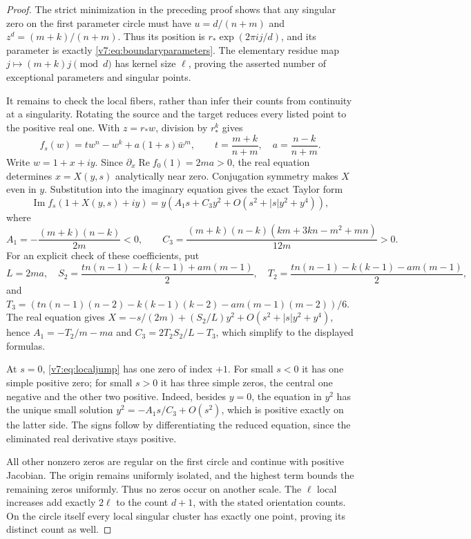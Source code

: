 \documentclass[UTF8,11pt]{ctexart}
\theoremstyle{definition}
\numberwithin{equation}{section}
\DeclareMathOperator{\Rea}{Re}\DeclareMathOperator{\Ima}{Im}
\begin{document}
\begin{proof}
The strict minimization in the preceding proof shows that any
singular zero on the first parameter circle must have
$u=d/(n+m)$ and $z^d=(m+k)/(n+m)$. Thus its position is
$r_*\exp(2\pi ij/d)$, and its parameter is exactly
\eqref{v7:eq:boundaryparameters}. The elementary residue map
$j\mapsto(m+k)j\pmod d$ has kernel size $\ell$, proving the
asserted number of exceptional parameters and singular points.

It remains to check the local fibers, rather than infer their
counts from continuity at a singularity. Rotating the source
and the target reduces every listed point to the positive real
one. With $z=r_*w$, division by $r_*^k$ gives
\[
 f_s(w)=t w^n-w^k+a(1+s)\bar w^m,\qquad
 t=\frac{m+k}{n+m},\quad a=\frac{n-k}{n+m}.
\]
Write $w=1+x+iy$. Since $\partial_x\Rea f_0(1)=2ma>0$,
the real equation determines $x=X(y,s)$ analytically near zero.
Conjugation symmetry makes $X$ even in $y$. Substitution into
the imaginary equation gives the exact Taylor form
\begin{equation}\label{v7:eq:localjump}
 \Ima f_s(1+X(y,s)+iy)
 =y\left(A_1s+C_3y^2+O(s^2+|s|y^2+y^4)\right),
\end{equation}
where
\[
 A_1=-\frac{(m+k)(n-k)}{2m}<0,\qquad
 C_3=\frac{(m+k)(n-k)(km+3kn-m^2+mn)}{12m}>0.
\]
For an explicit check of these coefficients, put
\[
 L=2ma,\quad
 S_2=\frac{tn(n-1)-k(k-1)+am(m-1)}2,\quad
 T_2=\frac{tn(n-1)-k(k-1)-am(m-1)}2,
\]
and $T_3=(tn(n-1)(n-2)-k(k-1)(k-2)-am(m-1)(m-2))/6$.
The real equation gives
$X=-s/(2m)+(S_2/L)y^2+O(s^2+|s|y^2+y^4)$, hence
$A_1=-T_2/m-ma$ and $C_3=2T_2S_2/L-T_3$, which simplify
to the displayed formulas.

At $s=0$, \eqref{v7:eq:localjump} has one zero of index $+1$.
For small $s<0$ it has one simple positive zero; for small
$s>0$ it has three simple zeros, the central one negative
and the other two positive. Indeed, besides $y=0$, the equation
in $y^2$ has the unique small solution
$y^2=-A_1s/C_3+O(s^2)$, which is positive exactly on the latter
side. The signs follow by differentiating the reduced equation,
since the eliminated real derivative stays positive.

All other nonzero zeros are regular on the first circle and
continue with positive Jacobian. The origin remains uniformly
isolated, and the highest term bounds the remaining zeros
uniformly. Thus no zeros occur on another scale. The $\ell$
local increases add exactly $2\ell$ to the count $d+1$, with
the stated orientation counts. On the circle itself every
local singular cluster has exactly one point, proving its
distinct count as well.
\end{proof}
\end{document}
